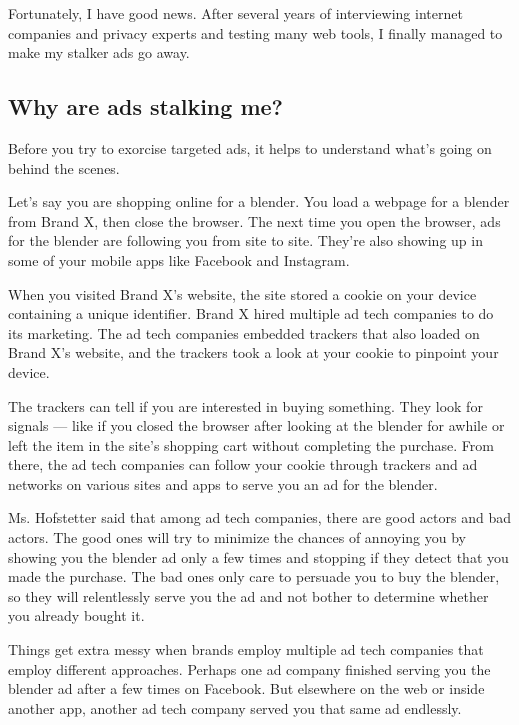 Fortunately, I have good news. After several years of interviewing
internet companies and privacy experts and testing many web tools, I
finally managed to make my stalker ads go away.

\hypertarget{why-are-ads-stalking-me}{%
\subsection{Why are ads stalking me?}\label{why-are-ads-stalking-me}}

Before you try to exorcise targeted ads, it helps to understand what's
going on behind the scenes.

Let's say you are shopping online for a blender. You load a webpage for
a blender from Brand X, then close the browser. The next time you open
the browser, ads for the blender are following you from site to site.
They're also showing up in some of your mobile apps like Facebook and
Instagram.

When you visited Brand X's website, the site stored a cookie on your
device containing a unique identifier. Brand X hired multiple ad tech
companies to do its marketing. The ad tech companies embedded trackers
that also loaded on Brand X's website, and the trackers took a look at
your cookie to pinpoint your device.

The trackers can tell if you are interested in buying something. They
look for signals --- like if you closed the browser after looking at the
blender for awhile or left the item in the site's shopping cart without
completing the purchase. From there, the ad tech companies can follow
your cookie through trackers and ad networks on various sites and apps
to serve you an ad for the blender.

Ms. Hofstetter said that among ad tech companies, there are good actors
and bad actors. The good ones will try to minimize the chances of
annoying you by showing you the blender ad only a few times and stopping
if they detect that you made the purchase. The bad ones only care to
persuade you to buy the blender, so they will relentlessly serve you the
ad and not bother to determine whether you already bought it.

Things get extra messy when brands employ multiple ad tech companies
that employ different approaches. Perhaps one ad company finished
serving you the blender ad after a few times on Facebook. But elsewhere
on the web or inside another app, another ad tech company served you
that same ad endlessly.

